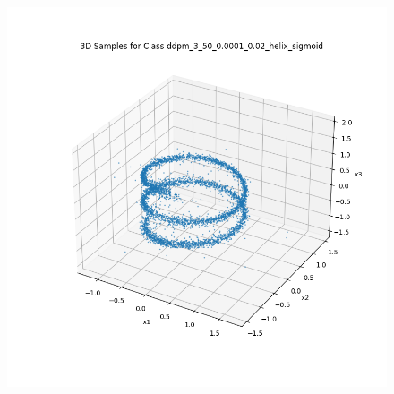 \documentclass[a4paper,12pt]{article}
\begin{document}
\begin{figure}[H]
\begin{minipage}{0.3\textwidth}
  \end{minipage}
  \begin{minipage}{0.3\textwidth}
      \centering
      \includegraphics[width=\linewidth]{"images/Samples for ddpm_3_50_0.0001_0.02_helix_sigmoid.png"}
  \end{minipage}

  \vspace{0.5cm}


\end{figure}
\end{document}
